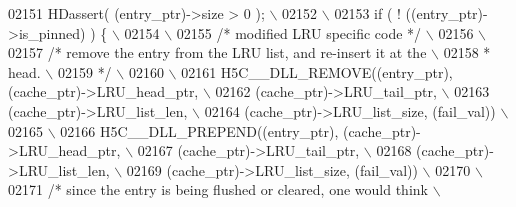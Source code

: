 \begin{DoxyCode}
02151 \textcolor{preprocessor}{    HDassert( (entry\_ptr)->size > 0 );                                      \(\backslash\)}
02152 \textcolor{preprocessor}{                                                                            \(\backslash\)}
02153 \textcolor{preprocessor}{    if ( ! ((entry\_ptr)->is\_pinned) ) \{                                     \(\backslash\)}
02154 \textcolor{preprocessor}{                                                                            \(\backslash\)}
02155 \textcolor{preprocessor}{        }\textcolor{comment}{/* modified LRU specific code */}\textcolor{preprocessor}{                                    \(\backslash\)}
02156 \textcolor{preprocessor}{                                                                            \(\backslash\)}
02157 \textcolor{preprocessor}{        }\textcolor{comment}{/* remove the entry from the LRU list, and re-insert it at the      \(\backslash\)}
02158 \textcolor{comment}{     * head.                                                            \(\backslash\)}
02159 \textcolor{comment}{     */}\textcolor{preprocessor}{                                                                 \(\backslash\)}
02160 \textcolor{preprocessor}{                                                                            \(\backslash\)}
02161 \textcolor{preprocessor}{        H5C\_\_DLL\_REMOVE((entry\_ptr), (cache\_ptr)->LRU\_head\_ptr,             \(\backslash\)}
02162 \textcolor{preprocessor}{                        (cache\_ptr)->LRU\_tail\_ptr,                          \(\backslash\)}
02163 \textcolor{preprocessor}{            (cache\_ptr)->LRU\_list\_len,                          \(\backslash\)}
02164 \textcolor{preprocessor}{                        (cache\_ptr)->LRU\_list\_size, (fail\_val))             \(\backslash\)}
02165 \textcolor{preprocessor}{                                                                            \(\backslash\)}
02166 \textcolor{preprocessor}{        H5C\_\_DLL\_PREPEND((entry\_ptr), (cache\_ptr)->LRU\_head\_ptr,            \(\backslash\)}
02167 \textcolor{preprocessor}{                         (cache\_ptr)->LRU\_tail\_ptr,                         \(\backslash\)}
02168 \textcolor{preprocessor}{             (cache\_ptr)->LRU\_list\_len,                         \(\backslash\)}
02169 \textcolor{preprocessor}{                         (cache\_ptr)->LRU\_list\_size, (fail\_val))            \(\backslash\)}
02170 \textcolor{preprocessor}{                                                                            \(\backslash\)}
02171 \textcolor{preprocessor}{        }\textcolor{comment}{/* since the entry is being flushed or cleared, one would think     \(\backslash\)}

\end{DoxyCode}

